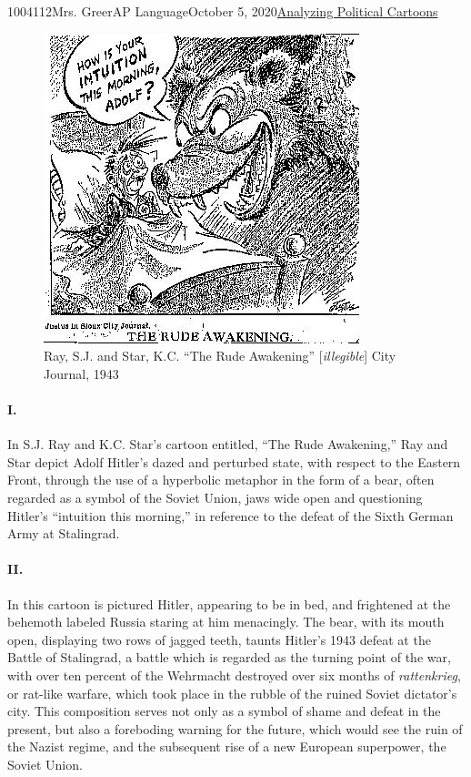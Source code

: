 \documentclass[12pt,letterpaper]{article}
\begin{document}
\begin{mla}{1004112}{}{Mrs. Greer}{AP Language}{October 5, 2020}{\underline{Analyzing Political Cartoons}} 

  \begin{justifying}

    \begin{figure}[h]
      \centering
      \includegraphics[width=.6\textwidth]{../Figures/Stalingrad.jpg}
      \caption{Ray, S.J. and Star, K.C. ``The Rude Awakening'' [\textit{illegible}] City Journal, 1943}
      \label{fig:1}
    \end{figure}

    \paragraph{I.} In S.J. Ray and K.C. Star's cartoon entitled, ``The Rude Awakening,'' Ray and Star depict Adolf Hitler's dazed and perturbed state, with respect to the Eastern Front, through the use of a hyperbolic metaphor in the form of a bear, often regarded as a symbol of the Soviet Union, jaws wide open and questioning Hitler's ``intuition this morning,'' in reference to the defeat of the Sixth German Army at Stalingrad.
    \paragraph{II.} In this cartoon is pictured Hitler, appearing to be in bed, and frightened at the behemoth labeled Russia staring at him menacingly. The bear, with its mouth open, displaying two rows of jagged teeth, taunts Hitler's 1943 defeat at the Battle of Stalingrad, a battle which is regarded as the turning point of the war, with over ten percent of the Wehrmacht destroyed over six months of \textit{rattenkrieg}, or rat-like warfare, which took place in the rubble of the ruined Soviet dictator's city. This composition serves not only as a symbol of shame and defeat in the present, but also a foreboding warning for the future, which would see the ruin of the Nazist regime, and the subsequent rise of a new European superpower, the Soviet Union.

\end{justifying}
\end{mla}
\end{document}
